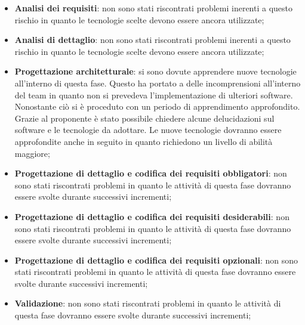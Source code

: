 			\begin{itemize}
				\item \textbf{Analisi dei requisiti}: non sono stati riscontrati problemi inerenti a questo rischio in quanto le tecnologie scelte devono essere ancora utilizzate;
				\item \textbf{Analisi di dettaglio}: non sono stati riscontrati problemi inerenti a questo rischio in quanto le tecnologie scelte devono essere ancora utilizzate;
				\item \textbf{Progettazione architetturale}: si sono dovute apprendere nuove tecnologie all'interno di questa fase. Questo ha portato a delle incomprensioni all'interno del team in quanto non si prevedeva l'implementazione di ulteriori software. Nonostante ciò si è proceduto con un periodo di apprendimento approfondito. Grazie al proponente è stato possibile chiedere alcune delucidazioni sul software e le tecnologie da adottare. Le nuove tecnologie dovranno essere approfondite anche in seguito in quanto richiedono un livello di abilità maggiore;
				\item \textbf{Progettazione di dettaglio e codifica dei requisiti obbligatori}: non sono stati riscontrati problemi in quanto le attività di questa fase dovranno essere svolte durante successivi incrementi;
				\item \textbf{Progettazione di dettaglio e codifica dei requisiti desiderabili}: non sono stati riscontrati problemi in quanto le attività di questa fase dovranno essere svolte durante successivi incrementi;
				\item \textbf{Progettazione di dettaglio e codifica dei requisiti opzionali}: non sono stati riscontrati problemi in quanto le attività di questa fase dovranno essere svolte durante successivi incrementi;
				\item \textbf{Validazione}: non sono stati riscontrati problemi in quanto le attività di questa fase dovranno essere svolte durante successivi incrementi;
			\end{itemize}


